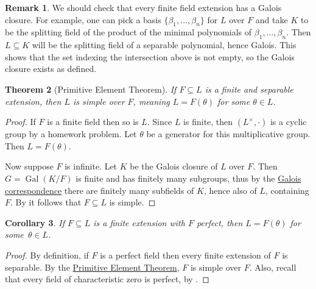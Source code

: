 \documentclass[12pt]{report}
\newtheorem{theorem}{Theorem}[chapter]
\newtheorem{corollary}[theorem]{Corollary}
\numberwithin{equation}{section}
\numberwithin{theorem}{chapter}
\theoremstyle{definition}
\newtheorem*{basic properties}{Basic Properties}
\newtheorem*{Important Remark}{Important Remark}
\newtheorem{remark}[theorem]{Remark}
\DeclareMathOperator{\Gal}{Gal}
\begin{document}
\begin{remark}
We should check that every finite field extension has a Galois closure.
For example, one can pick a basis $\{\beta_1,\ldots,\beta_n\}$ for $L$ over $F$ and take $K$ to be the splitting field of the product of the minimal polynomials of $\beta_1,\ldots,\beta_n$. Then $L \subseteq K$ will be the splitting field of a separable polynomial, hence Galois. 
This shows that the set indexing the intersection above is not empty, so the Galois closure exists as defined.
\end{remark}





\begin{theorem}[Primitive Element Theorem]\label{primitive element theorem}
If $F \subseteq L$ is a finite and separable extension, then $L$ is simple over $F$, meaning $L=F(\theta)$ for some $\theta \in L$.\end{theorem}

\begin{proof}
If $F$ is a finite field then so is $L$. Since $L$ is finite, then $(L^\times,\cdot)$ is a cyclic group by a homework problem. Let $\theta$ be a generator for this multiplicative group. Then $L=F(\theta)$.

Now suppose $F$ is infinite. Let $K$ be the Galois closure of $L$ over $F$. Then $G=\Gal(K/F)$ is finite and has finitely many subgroups, thus by the \hyperref[Fundamental Theorem of Galois Theory]{Galois correspondence} there are finitely many subfields of $K$, hence also of $L$, containing $F$. By  it follows that $F \subseteq L$ is simple.
\end{proof}


\begin{corollary}\label{finite extensions of char 0 fields are simple}
	If $F \subseteq L$ is a finite extension with $F$ perfect, then $L=F(\theta)$ for some~$\theta \in L$. 
\end{corollary}

\begin{proof}
	By definition, if $F$ is a perfect field then every finite extension of $F$ is separable. By the \hyperref[primitive element theorem]{Primitive Element Theorem}, $F$ is simple over $F$. Also, recall that every field of characteristic zero is perfect, by .
\end{proof}
\end{document}
